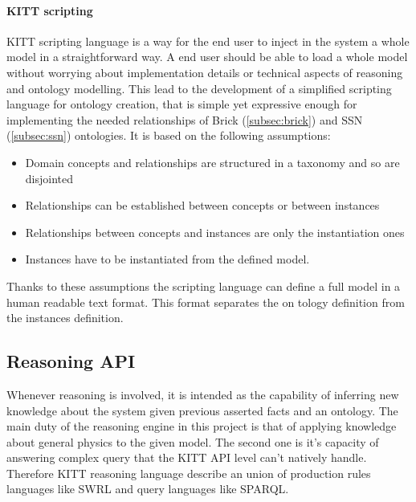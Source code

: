\paragraph{KITT scripting}
KITT scripting language is a way for the end user to inject in the system a whole model in a straightforward way. A end user should be able to load a whole model without worrying about implementation details or technical aspects of reasoning and ontology modelling. This lead to the development of a simplified scripting language for ontology creation, that is simple yet expressive enough for implementing the needed relationships of Brick (\autoref{subsec:brick}) and SSN (\autoref{subsec:ssn}) ontologies. It is based on the following assumptions:
\begin{itemize}
  \item Domain concepts and relationships are structured in a taxonomy and so are disjointed
  \item Relationships can be established between concepts or between instances
  \item Relationships between concepts and instances are only the instantiation ones
  \item Instances have to be instantiated from the defined model.
\end{itemize}
Thanks to these assumptions the scripting language can define a full model in a human readable text format. This format separates the on
tology definition from the instances definition.

\subsection{Reasoning API}
Whenever reasoning is involved, it is intended as the capability of inferring new knowledge about the system given previous asserted facts and an ontology. The main duty of the reasoning engine in this project is that of applying knowledge about general physics to the given model. The second one is it's capacity of answering complex query that the KITT API level can't natively handle. Therefore KITT reasoning language describe an union of production rules languages like SWRL and query languages like SPARQL.

